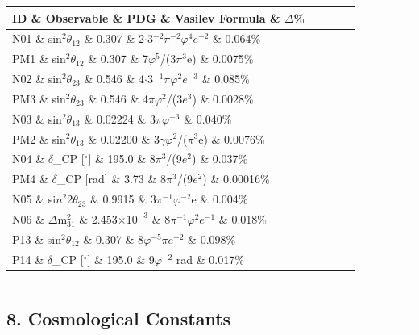 \begin{tabular}{|l|l|l|l|l|}
\hline
ID \& Observable \& PDG \& Vasilev Formula \& $\Delta$\% \\
\hline
N01 \& sin$^{2}\theta_{12}$ \& 0.307 \& 2$\cdot$3$^{-2}\pi^{-2}\varphi^{4}$$e^{-2}$ \& 0.064\% \\
PM1 \& sin$^{2}\theta_{12}$ \& 0.307 \& 7$\varphi^{5}$/(3$\pi^{3}$e) \& 0.0075\% \\
N02 \& sin$^{2}\theta_{23}$ \& 0.546 \& 4$\cdot$3$^{-1}\pi\varphi^{2}$$e^{-3}$ \& 0.085\% \\
PM3 \& sin$^{2}\theta_{23}$ \& 0.546 \& 4$\pi\varphi^{2}$/(3$e^{3}$) \& 0.0028\% \\
N03 \& sin$^{2}\theta_{13}$ \& 0.02224 \& 3$\pi\varphi^{-3}$ \& 0.040\% \\
PM2 \& sin$^{2}\theta_{13}$ \& 0.02200 \& 3$\gamma\varphi^{2}$/($\pi^{3}$e) \& 0.0076\% \\
N04 \& $\delta$\_CP [$^{\circ}$] \& 195.0 \& 8$\pi^{3}$/(9$e^{2}$) \& 0.037\% \\
PM4 \& $\delta$\_CP [rad] \& 3.73 \& 8$\pi^{3}$/(9$e^{2}$) \& 0.00016\% \\
N05 \& si$n^{2}$2$\theta_{23}$ \& 0.9915 \& 3$\pi^{-1}\varphi^{-2}$e \& 0.004\% \\
N06 \& $\Delta$m$^{2}_{31}$ \& 2.453$\times$1$0^{-3}$ \& 8$\pi^{-1}\varphi^{2}$$e^{-1}$ \& 0.018\% \\
P13 \& sin$^{2}\theta_{12}$ \& 0.307 \& 8$\varphi^{-5}\pi$$e^{-2}$ \& 0.098\% \\
P14 \& $\delta$\_CP [$^{\circ}$] \& 195.0 \& 9$\varphi^{-2}$ rad \& 0.017\% \\
\hline
\end{tabular}
\noindent\rule{\textwidth}{0.4pt}

\subsection{8. Cosmological Constants}

